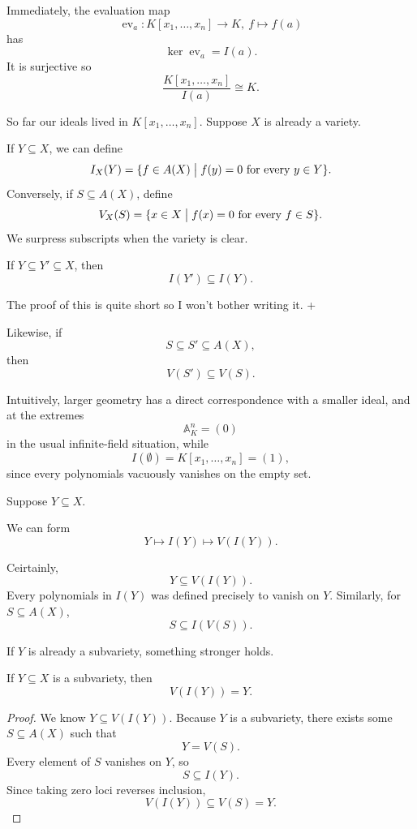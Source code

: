 \documentclass[11pt]{article}
\begin{document}
Immediately, the evaluation map 
\[ 
    \operatorname{ev}_a : K[x_1,\ldots,x_n] \to K, \ 
    f \mapsto f(a) 
\]
has 
\[
    \ker \operatorname{ev}_a = I(a). 
\]
It is surjective so 
\[
    \frac{K[x_1,\ldots,x_n]}{I(a)} \cong K. 
\]

So far our ideals lived in $K[x_1,\ldots,x_n]$. 
Suppose $X$ is already a variety. 

If $Y \subseteq X$, we can define 
\[
    I_X(Y) = \{f \in A(X) \bigm| f(y) = 0 \ \text{for every} \ 
    y \in Y\}. 
\] 
Conversely, if $S \subseteq A(X)$, define 
\[ 
    V_X(S) = \{x \in X \bigm| f(x) = 0 \ \text{for every} \ 
    f \in S\}. 
\]
We surpress subscripts when the variety is clear. 

\begin{prop}
    If $Y \subseteq Y' \subseteq X$, 
    then 
    \[ 
        I(Y') \subseteq I(Y). 
    \]
\end{prop}
The proof of this is quite short so I won't bother writing it. +

Likewise, if 
\[
    S \subseteq S' \subseteq A(X), 
\]
then 
\[
    V(S') \subseteq V(S). 
\]

Intuitively, larger geometry has a direct correspondence 
with a smaller ideal, and at the extremes 
\[ 
    \mathbb A^n_K = (0)
\]
in the usual infinite-field situation, while 
\[ 
    I(\emptyset) = K[x_1,\ldots,x_n] = (1),
\]
since every polynomials vacuously vanishes on the 
empty set. 

Suppose $Y \subseteq X$. 

We can form 
\[
    Y \mapsto I(Y) \mapsto V(I(Y)). 
\]

Ceirtainly, 
\[
    Y \subseteq V(I(Y)).
\]
Every polynomials in $I(Y)$ was defined precisely 
to vanish on $Y$. 
Similarly, for $S\subseteq A(X)$, 
\[
    S \subseteq I(V(S)). 
\]

If $Y$ is already a subvariety, something stronger holds. 

\begin{prop}
    If $Y \subseteq X$ is a subvariety, then 
    \[
        V(I(Y)) = Y. 
    \]
\end{prop}
\begin{proof}
    We know $Y \subseteq V(I(Y))$. 
    Because $Y$ is a subvariety, there exists some 
    $S \subseteq A(X)$ such that 
    \[
        Y = V(S). 
    \]
    Every element of $S$ vanishes on $Y$, so 
    \[
        S \subseteq I(Y). 
    \]
    Since taking zero loci reverses inclusion, 
    \[ 
        V(I(Y)) \subseteq V(S) = Y. 
    \]
\end{proof}
\end{document}
